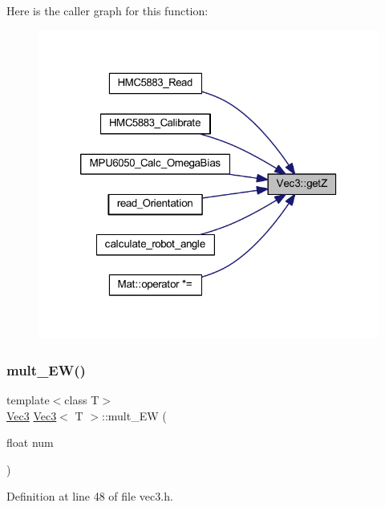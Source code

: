 Here is the caller graph for this function\+:
\nopagebreak
\begin{figure}[H]
\begin{center}
\leavevmode
\includegraphics[width=320pt]{class_vec3_a52f0db1c387aa9bc7befe5792b698553_icgraph}
\end{center}
\end{figure}
\mbox{\label{class_vec3_a987916221fa68ba597397f51d5cf51b0}} 
\subsubsection{\texorpdfstring{mult\_EW()}{mult\_EW()}\hspace{0.1cm}{\footnotesize\ttfamily [1/2]}}
{\footnotesize\ttfamily template$<$class T$>$ \\
\mbox{\hyperlink{class_vec3}{Vec3}} \mbox{\hyperlink{class_vec3}{Vec3}}$<$ T $>$\+::mult\+\_\+\+EW (\begin{DoxyParamCaption}\item[{float}]{num }\end{DoxyParamCaption})\hspace{0.3cm}{\ttfamily [inline]}}



Definition at line 48 of file vec3.\+h.

\mbox{\label{class_vec3_a3c49d6ccaf343f2182f5d8e5eb39df2c}} 
